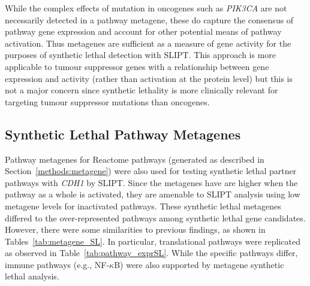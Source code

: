 While the complex effects of mutation in oncogenes such as \textit{PIK3CA} are not necessarily detected in a pathway metagene, these do capture the consensus of pathway gene expression and account for other potential means of pathway activation. Thus metagenes are sufficient as a measure of gene activity for the purposes of synthetic lethal detection with \gls{SLIPT}. This approach is more applicable to tumour suppressor genes with a relationship between gene expression and activity (rather than activation at the protein level) but this is not a major concern since synthetic lethality is more clinically relevant for targeting tumour suppressor mutations than oncogenes.
\fi


\FloatBarrier

\subsection{Synthetic Lethal Pathway Metagenes} \label{chapt3:metagene_SL}

Pathway metagenes for Reactome pathways (generated as described in Section~\ref{methods:metagene}) were also used for testing synthetic lethal partner pathways with \textit{CDH1} by \gls{SLIPT}. Since the metagenes have are higher when the pathway as a whole is activated, they are amenable to \gls{SLIPT} analysis using low metagene levels for inactivated pathways. These synthetic lethal metagenes differed to the over-represented pathways among synthetic lethal gene candidates. However, there were some similarities to previous findings, as shown in Tables~\ref{tab:metagene_SL}. In particular, translational pathways were replicated as observed in Table~\ref{tab:pathway_exprSL}. While the specific pathways differ, immune pathways (e.g., NF-$\kappa$B) were also supported by metagene synthetic lethal analysis.

